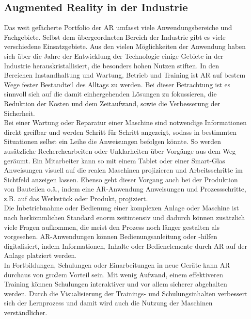 \subsection{Augmented Reality in der Industrie}
Das weit gefächerte Portfolio der \acl{AR} umfasst viele Anwendungsbereiche und Fachgebiete. Selbst dem übergeordneten Bereich der Industrie 
gibt es viele verschiedene Einsatzgebiete. Aus den vielen Möglichkeiten der Anwendung haben sich über die Jahre der Entwicklung der Technologie 
einige Gebiete in der Industrie herauskristallisiert, die besonders hohen Nutzen stiften. \cite{einsatzgebietear.2017a} In den Bereichen 
Instandhaltung und Wartung, Betrieb und Training ist \acl{AR} auf bestem Wege fester Bestandteil des Alltags zu werden. Bei dieser Betrachtung 
ist es sinnvoll sich auf die damit einhergehenden Lösungen zu fokussieren, die Reduktion der Kosten und dem Zeitaufwand, sowie die Verbesserung 
der Sicherheit. \cite{studieptc.2020j} 
\\ 
\linebreak
Bei einer Wartung oder Reparatur einer Maschine sind notwendige Informationen direkt greifbar und werden Schritt für Schritt angezeigt, sodass 
in bestimmten Situationen selbst ein Leihe die Anweisungen befolgen könnte. So werden zusätzliche Recherchearbeiten oder Unklarheiten über 
Vorgänge aus dem Weg geräumt. Ein Mitarbeiter kann so mit einem Tablet oder einer Smart-Glas Anweisungen visuell auf die realen Maschinen 
projizieren und Arbeitsschritte im Sichtfeld anzeigen lassen. Ebenso geht dieser Vorgang auch bei der Produktion von Bauteilen o.ä., indem 
eine \acs{AR}-Anwendung Anweisungen und Prozessschritte, z.B. auf das Werkstück oder Produkt, projiziert.
\\ 
Die Inbetriebnahme oder Bedienung einer komplexen Anlage oder Maschine ist nach herkömmlichen Standard enorm zeitintensiv und dadurch können
zusätzlich viele Fragen aufkommen, die meist den Prozess noch länger gestalten als vorgesehen. \acs{AR}-Anwendungen können 
Bedienungsanleitung oder -hilfen digitalisiert, indem Informationen, Inhalte oder Bedienelemente durch \acl{AR} auf der Anlage platziert werden. 
\\ 
In Fortbildungen, Schulungen oder Einarbeitungen in neue Geräte kann \acs{AR} durchaus von großem Vorteil sein. Mit wenig Aufwand, einem 
effektiveren Training können Schulungen interaktiver und vor allem sicherer abgehalten werden. Durch die Visualisierung der Trainings- und 
Schulungsinhalten verbessert sich der Lernprozess und damit wird auch die Nutzung der Maschinen verständlicher. \cite{einsatzgebietear.2017a}